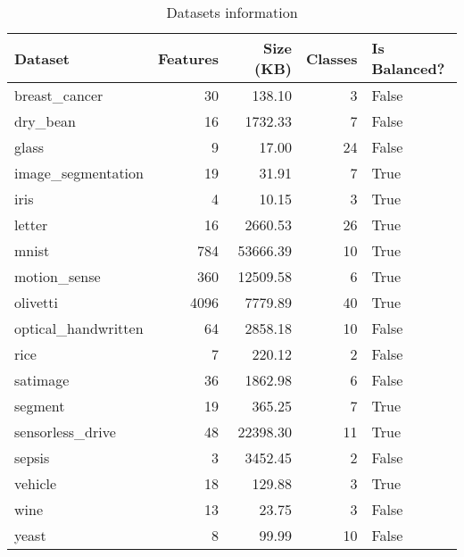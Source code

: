 \begin{table}
\centering
\caption{Datasets information}
\label{tab:datasets_info}
\begin{tabular}{lrrrl}
\toprule
            Dataset &  Features &  Size (KB) &  Classes &  Is Balanced? \\
\midrule
      breast\_cancer &        30 &     138.10 &        3 &         False \\
           dry\_bean &        16 &    1732.33 &        7 &         False \\
              glass &         9 &      17.00 &       24 &         False \\
 image\_segmentation &        19 &      31.91 &        7 &          True \\
               iris &         4 &      10.15 &        3 &          True \\
             letter &        16 &    2660.53 &       26 &          True \\
              mnist &       784 &   53666.39 &       10 &          True \\
       motion\_sense &       360 &   12509.58 &        6 &          True \\
           olivetti &      4096 &    7779.89 &       40 &          True \\
optical\_handwritten &        64 &    2858.18 &       10 &         False \\
               rice &         7 &     220.12 &        2 &         False \\
           satimage &        36 &    1862.98 &        6 &         False \\
            segment &        19 &     365.25 &        7 &          True \\
   sensorless\_drive &        48 &   22398.30 &       11 &          True \\
             sepsis &         3 &    3452.45 &        2 &         False \\
            vehicle &        18 &     129.88 &        3 &          True \\
               wine &        13 &      23.75 &        3 &         False \\
              yeast &         8 &      99.99 &       10 &         False \\
\bottomrule
\end{tabular}
\end{table}
